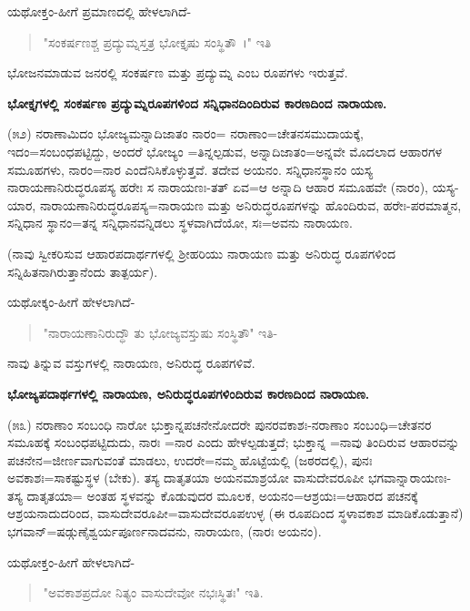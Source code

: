 ಯಥೋಕ್ತಂ-ಹೀಗೆ ಪ್ರಮಾಣದಲ್ಲಿ ಹೇಳಲಾಗಿದೆ-

\begin{verse}
"ಸಂಕರ್ಷಣಶ್ಚ ಪ್ರದ್ಯುಮ್ನಸ್ತತ್ರ ಭೋಕ್ತೃಷು ಸಂಸ್ಥಿತೌ~।" ಇತಿ
\end{verse}

\noindent
ಭೋಜನಮಾಡುವ ಜನರಲ್ಲಿ ಸಂಕರ್ಷಣ ಮತ್ತು ಪ್ರದ್ಯುಮ್ನ ಎಂಬ ರೂಪಗಳು ಇರುತ್ತವೆ.

\begin{center}
\textbf{ಭೋಕ್ತೃಗಳಲ್ಲಿ ಸಂಕರ್ಷಣ ಪ್ರದ್ಯುಮ್ನರೂಪಗಳಿಂದ ಸನ್ನಿಧಾನದಿಂದಿರುವ ಕಾರಣದಿಂದ ನಾರಾಯಣ.}
\end{center}

(೫೨) ನರಾಣಾಮಿದಂ ಭೋಜ್ಯಮನ್ನಾದಿಜಾತಂ ನಾರಂ= ನರಾಣಾಂ=ಚೇತನಸಮುದಾಯಕ್ಕೆ, ಇದಂ=ಸಂಬಂಧಪಟ್ಟಿದ್ದು, ಅಂದರೆ ಭೋಜ್ಯಂ =ತಿನ್ನಲ್ಪಡುವ, ಅನ್ನಾದಿಜಾತಂ=ಅನ್ನವೇ ಮೊದಲಾದ ಆಹಾರಗಳ ಸಮೂಹಗಳು, ನಾರಂ=ನಾರ ಎಂದೆನಿಸಿಕೊಳ್ಳುತ್ತವೆ. ತದೇವ ಅಯನಂ. ಸನ್ನಿಧಾನಸ್ಥಾನಂ ಯಸ್ಯ ನಾರಾಯಣಾನಿರುದ್ಧರೂಪಸ್ಯ ಹರೇಃ ಸ ನಾರಾಯಣಃ-ತತ್ ಏವ=ಆ ಅನ್ನಾದಿ ಆಹಾರ ಸಮೂಹವೇ (ನಾರಂ), ಯಸ್ಯ-ಯಾರ, ನಾರಾಯಣಾನಿರುದ್ಧರೂಪಸ್ಯ=ನಾರಾಯಣ ಮತ್ತು ಅನಿರುದ್ಧರೂಪಗಳನ್ನು ಹೊಂದಿರುವ, ಹರೇಃ-ಪರಮಾತ್ಮನ, ಸನ್ನಿಧಾನ ಸ್ಥಾನಂ=ತನ್ನ ಸನ್ನಿಧಾನವನ್ನಿಡಲು ಸ್ಥಳವಾಗಿದೆಯೋ, ಸಃ=ಅವನು ನಾರಾಯಣ.

(ನಾವು ಸ್ವೀಕರಿಸುವ ಆಹಾರಪದಾರ್ಥಗಳಲ್ಲಿ ಶ‍್ರೀಹರಿಯು ನಾರಾಯಣ ಮತ್ತು ಅನಿರುದ್ಧ ರೂಪಗಳಿಂದ ಸನ್ನಿಹಿತನಾಗಿರುತ್ತಾನೆಂದು ತಾತ್ಪರ್ಯ).

ಯಥೋಕ್ಕಂ-ಹೀಗೆ ಹೇಳಲಾಗಿದೆ-

\begin{verse}
"ನಾರಾಯಣಾನಿರುದ್ಧೌ ತು ಭೋಜ್ಯವಸ್ತುಷು ಸಂಸ್ಥಿತೌ" ಇತಿ-
\end{verse}

\noindent
ನಾವು ತಿನ್ನುವ ವಸ್ತುಗಳಲ್ಲಿ ನಾರಾಯಣ, ಅನಿರುದ್ಧ ರೂಪಗಳಿವೆ.

\begin{center}
\textbf{ಭೋಜ್ಯಪದಾರ್ಥಗಳಲ್ಲಿ ನಾರಾಯಣ, ಅನಿರುದ್ಧರೂಪಗಳಿಂದಿರುವ ಕಾರಣದಿಂದ ನಾರಾಯಣ.}
\end{center}

(೫೩) ನರಾಣಾಂ ಸಂಬಂಧಿ ನಾರೋ ಭುಕ್ತಾನ್ನಪಚನೇನೋದರೇ ಪುನರವಕಾಶಃ-ನರಾಣಾಂ ಸಂಬಂಧಿ=ಚೇತನರ ಸಮೂಹಕ್ಕೆ ಸಂಬಂಧಪಟ್ಟಿದುದು, ನಾರಃ =ನಾರ ಎಂದು ಹೇಳಲ್ಪಡುತ್ತದೆ; ಭುಕ್ತಾನ್ನ =ನಾವು ತಿಂದಿರುವ ಆಹಾರವನ್ನು ಪಚನೇನ=ಜೀರ್ಣವಾಗುವಂತೆ ಮಾಡಲು, ಉದರೇ=ನಮ್ಮ ಹೊಟ್ಟೆಯಲ್ಲಿ (ಜಠರದಲ್ಲಿ), ಪುನಃ ಅವಕಾಶಃ=ಸಾಕಷ್ಟುಸ್ಥಳ (ಬೇಕು). ತಸ್ಯ ದಾತೃತಯಾ ಅಯನಮಾಶ್ರಯೋ ವಾಸುದೇವರೂಪೀ ಭಗವಾನ್ನಾರಾಯಣಃ-ತಸ್ಯ ದಾತೃತಯಾ= ಅಂತಹ ಸ್ಥಳವನ್ನು ಕೊಡುವುದರ ಮೂಲಕ, ಅಯನಂ=ಆಶ್ರಯಃ=ಆಹಾರದ ಪಚನಕ್ಕೆ ಆಶ್ರಯನಾದುದರಿಂದ, ವಾಸುದೇವರೂಪೀ=ವಾಸುದೇವರೂಪಉಳ್ಳ (ಈ ರೂಪದಿಂದ ಸ್ಥಳಾವಕಾಶ ಮಾಡಿಕೊಡುತ್ತಾನೆ) ಭಗವಾನ್=ಷಡ್ಗುಣೈಶ್ವರ್ಯಪೂರ್ಣನಾದವನು, ನಾರಾಯಣ, (ನಾರಃ ಅಯನಂ).

ಯಥೋಕ್ತಂ-ಹೀಗೆ ಹೇಳಲಾಗಿದೆ-

\begin{verse}
"ಅವಕಾಶಪ್ರದೋ ನಿತ್ಯಂ ವಾಸುದೇವೋ ನಭಃಸ್ಥಿತಃ" ಇತಿ.
\end{verse}

